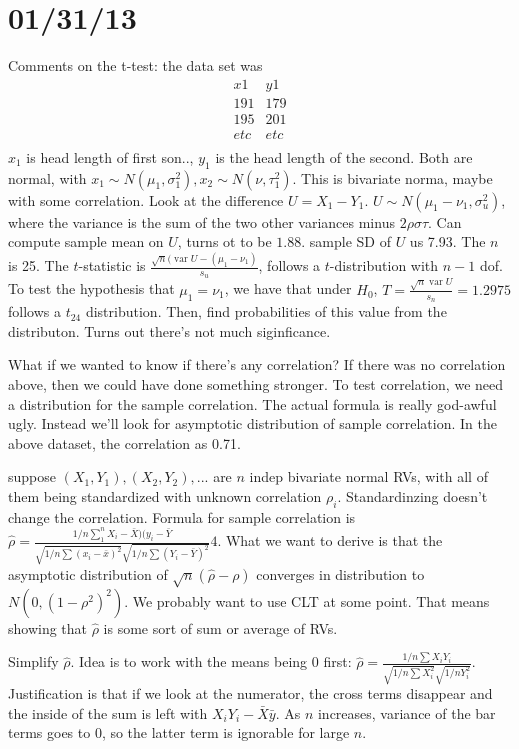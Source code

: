 \documentclass{article}
\DeclareMathOperator{\var}{var}
\begin{document}
\section*{01/31/13}
Comments on the t-test: the data set was 
$$
\begin{array}{cc}
x1&y1\\
191&179\\
195&201\\
etc&etc\\
\end{array}
$$
$x_1$ is head length of first son.., $y_1$ is the head length of the second. Both are normal, with $x_1\sim N(\mu_1,\sigma_1^2),x_2\sim N(\nu,\tau_1^2)$. This is bivariate norma, maybe with some correlation. Look at the difference $U=X_1-Y_1$. $U\sim N(\mu_1-\nu_1,\sigma_u^2)$, where the variance is the sum of the two other variances minus $2\rho\sigma\tau$. Can compute sample mean on $U$, turns ot to be $1.88$. sample SD of $U$ us 7.93. The $n$ is 25. The $t$-statistic is $\frac{\sqrt{n}(\var{U}-(\mu_1-\nu_1)}{s_u}$, follows a $t$-distribution with $n-1$ dof. To test the hypothesis that $\mu_1=\nu_1$, we have that under $H_0$, $T=\frac{\sqrt{n}\var{U}}{s_n}=1.2975$ follows a $t_24$ distribution. Then, find probabilities of this value from the distributon. Turns out there's not much siginficance. 

What if we wanted to know if there's any correlation? If there was no correlation above, then we could have done something stronger. To test correlation, we need a distribution for the sample correlation. The actual formula is really god-awful ugly. Instead we'll look for asymptotic distribution of sample correlation. In the above dataset, the correlation as 0.71. 

suppose $(X_1,Y_1),(X_2,Y_2),...$ are $n$ indep bivariate normal RVs, with all of them being standardized with unknown correlation $\rho_i$. Standardinzing doesn't change the correlation. Formula for sample correlation is $\hat{\rho}=\frac{1/n\sum_1^nX_i-\bar{X})(y_i-\bar{Y}}{\sqrt{1/n\sum(x_i-\bar{x})^2}\sqrt{1/n\sum(Y_i-\bar{Y})^2}}4$. What we want to derive is that the asymptotic distribution of $\sqrt{n}(\hat{\rho}-\rho)$ converges in distribution to $N(0,(1-\rho^2)^2)$. We probably want to use CLT at some point. That means showing that $\hat{\rho}$ is some sort of sum or average of RVs. 

Simplify $\hat{\rho}$. Idea is to work with the means being $0$ first: $\hat{\rho}=\frac{1/n\sum X_iY_i}{\sqrt{1/n\sum X_i^2}\sqrt{1/nY_i^2}}$. Justification is that if we look at the numerator, the cross terms disappear and the inside of the sum is left with $X_iY_i-\bar{X}\bar{y}$. As $n$ increases, variance of the bar terms goes to $0$, so the latter term is ignorable for large $n$. 
\end{document}
